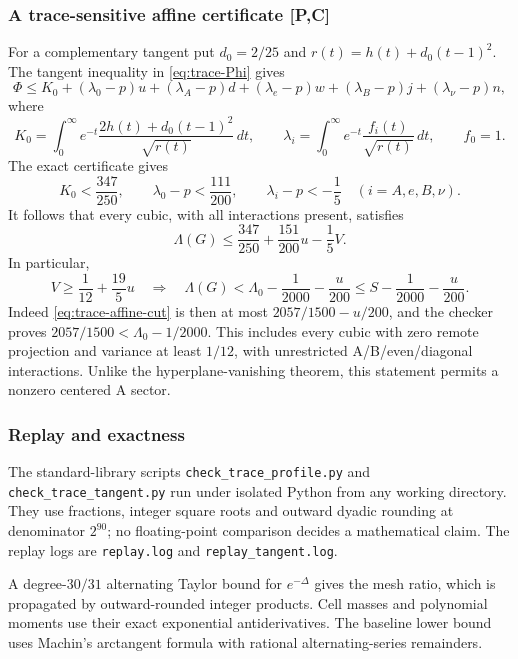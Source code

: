 \subsubsection{A trace-sensitive affine certificate [P,C]}
For a complementary tangent put $d_0=2/25$ and
$r(t)=h(t)+d_0(t-1)^2$. The tangent inequality in
\eqref{eq:trace-Phi} gives
\[
\Phi\le K_0+(\lambda_0-p)u+(\lambda_A-p)d+
(\lambda_e-p)w+(\lambda_B-p)j+(\lambda_\nu-p)n,
\]
where
\[
K_0=\int_0^\infty e^{-t}
\frac{2h(t)+d_0(t-1)^2}{\sqrt{r(t)}}\,dt,
\qquad
\lambda_i=\int_0^\infty e^{-t}\frac{f_i(t)}{\sqrt{r(t)}}\,dt,
\qquad f_0=1.
\]
The exact certificate gives
\[
K_0<\frac{347}{250},\qquad
\lambda_0-p<\frac{111}{200},\qquad
\lambda_i-p<-\frac15\quad(i=A,e,B,\nu).
\]
It follows that every cubic, with all interactions present, satisfies
\begin{equation}
\boxed{\Lambda(G)\le\frac{347}{250}+\frac{151}{200}u-\frac15V.}
\label{eq:trace-affine-cut}
\end{equation}
In particular,
\begin{equation}
\boxed{V\ge\frac1{12}+\frac{19}{5}u\quad\Longrightarrow\quad
\Lambda(G)<\Lambda_0-\frac1{2000}-\frac{u}{200}
\le S-\frac1{2000}-\frac{u}{200}.}
\label{eq:trace-affine-exclusion}
\end{equation}
Indeed \eqref{eq:trace-affine-cut} is then at most
$2057/1500-u/200$, and the checker proves
$2057/1500<\Lambda_0-1/2000$.
This includes every cubic with zero remote projection and variance at
least $1/12$, with unrestricted A/B/even/diagonal interactions. Unlike
the hyperplane-vanishing theorem, this statement permits a nonzero
centered A sector.

\subsubsection{Replay and exactness}
The standard-library scripts \texttt{check\_trace\_profile.py} and
\texttt{check\_trace\_tangent.py} run under isolated Python from any
working directory. They use fractions, integer square roots and
outward dyadic rounding at denominator $2^{90}$; no floating-point
comparison decides a mathematical claim. The replay logs are
\texttt{replay.log} and \texttt{replay\_tangent.log}.

A degree-$30/31$ alternating Taylor bound for $e^{-\Delta}$ gives the
mesh ratio, which is propagated by outward-rounded integer products.
Cell masses and polynomial moments use their exact exponential
antiderivatives. The baseline lower bound uses Machin's arctangent
formula with rational alternating-series remainders.

